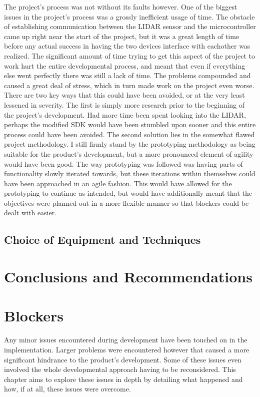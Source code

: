 	The project's process was not without its faults however. One of the biggest issues in the project's process was a grossly inefficient usage of time. The obstacle of establishing communication between the LIDAR sensor and the microcontroller came up right near the start of the project, but it was a great length of time before any actual success in having the two devices interface with eachother was realized. The significant amount of time trying to get this aspect of the project to work hurt the entire developmental process, and meant that even if everything else went perfectly there was still a lack of time. The problems compounded and caused a great deal of stress, which in turn made work on the project even worse. There are two key ways that this could have been avoided, or at the very least lessened in severity. The first is simply more research prior to the beginning of the project's development. Had more time been spent looking into the LIDAR, perhaps the modified SDK would have been stumbled upon sooner and this entire process could have been avoided. The second solution lies in the somewhat flawed project methodology. I still firmly stand by the prototyping methodology as being suitable for the product's development, but a more pronounced element of agility would have been good. The way prototyping was followed was having parts of functionality slowly iterated towards, but these iterations within themselves could have been approached in an agile fashion. This would have allowed for the prototyping to continue as intended, but would have additionally meant that the objectives were planned out in a more flexible manner so that blockers could be dealt with easier.
	
		\section{Choice of Equipment and Techniques}
	
	
	\chapter{Conclusions and Recommendations}
	
	
	
	
	
	
	
	\chapter{Blockers}
	Any minor issues encountered during development have been touched on in the implementation. Larger problems were encountered however that caused a more significant hindrance to the product's development. Some of these issues even involved the whole developmental approach having to be reconsidered. This chapter aims to explore these issues in depth by detailing what happened and how, if at all, these issues were overcome.
	

